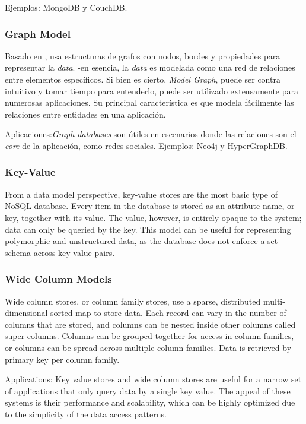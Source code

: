 Ejemplos: MongoDB y CouchDB.

\subsubsection*{Graph Model}

Basado en , usa estructuras de grafos con nodos, bordes y propiedades para representar la \textit{data}. -en esencia, la \textit{data} es modelada como una red de relaciones entre elementos específicos. Si bien es cierto, \textit{Model Graph}, puede ser contra intuitivo y tomar tiempo para entenderlo, puede ser utilizado extensamente para numerosas aplicaciones. Su principal característica es que modela fácilmente las relaciones entre entidades en una aplicación.

Aplicaciones:\textit{Graph databases} son útiles en escenarios donde las relaciones son el \textit{core} de la aplicación, como redes sociales.
Ejemplos: Neo4j y HyperGraphDB.

\subsubsection*{Key-Value}

From a data model perspective, key-value stores are the
most basic type of NoSQL database. Every item in the
database is stored as an attribute name, or key, together
with its value. The value, however, is entirely opaque to the
system; data can only be queried by the key. This model
can be useful for representing polymorphic and
unstructured data, as the database does not enforce a set
schema across key-value pairs.

\subsubsection*{Wide Column Models}

Wide column stores, or column family stores, use a sparse,
distributed multi-dimensional sorted map to store data.
Each record can vary in the number of columns that are
stored, and columns can be nested inside other columns
called super columns. Columns can be grouped together
for access in column families, or columns can be spread
across multiple column families. Data is retrieved by
primary key per column family.

Applications: Key value stores and wide column stores
are useful for a narrow set of applications that only query
data by a single key value. The appeal of these systems is
their performance and scalability, which can be highly
optimized due to the simplicity of the data access patterns.

